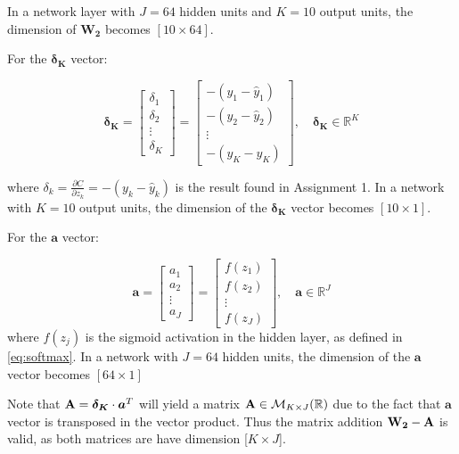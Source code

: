\documentclass{article}
\begin{document}
In a network layer with $J = 64$ hidden units and $K = 10$ output units, the dimension of $\mathbf{W_2}$ becomes $[10\times64]$.

For the $\boldsymbol{\delta_K}$ vector:

\begin{equation}
    \boldsymbol{\delta_K} = 
    \begin{bmatrix}
        \delta_1 \\
        \delta_2 \\
        \vdots \\
        \delta_K
    \end{bmatrix}
    = \begin{bmatrix}
        -(y_1 - \hat{y}_1) \\
        -(y_2 - \hat{y}_2)\\
        \vdots \\
        -(y_K - \hat{y}_K)
    \end{bmatrix}
    , \quad \boldsymbol{\delta_K} \in \mathbb{R}^K
    \label{eq:errorvec_k}
\end{equation}

where $\delta_k = \frac{\partial C}{\partial z_k} = -(y_k - \hat{y}_k)$ is the result found in Assignment 1. In a network with $K = 10$ output units, the dimension of the $\boldsymbol{\delta_K}$ vector becomes $[10\times1]$.

For the $\boldsymbol{a}$ vector:

\begin{equation}
    \boldsymbol{a} = \begin{bmatrix}
        a_1 \\
        a_2 \\
        \vdots \\
        a_J
    \end{bmatrix}
    =
    \begin{bmatrix}
        f(z_1) \\
        f(z_2) \\
        \vdots \\
        f(z_J)
    \end{bmatrix},
    \quad \boldsymbol{a} \in \mathbb{R}^J
\end{equation}
where $f(z_j)$ is the sigmoid activation in the hidden layer, as defined in \eqref{eq:softmax}. In a network with $J = 64$ hidden units, the dimension of the $\boldsymbol{a}$ vector becomes $[64\times1]$


    Note that $\text{\textbf{A}} = \boldsymbol{\delta_K} \cdot \boldsymbol{a}^T$ will yield a matrix $\text{\textbf{A}} \in \mathcal{M}_{K \times J}(\mathbb{R})$ due to the fact that $\boldsymbol{a}$ vector is transposed in the vector product. Thus the matrix addition $\text{\textbf{W}}_\textbf{2} - \text{\textbf{A}}$ is valid, as both matrices are have dimension [$K \times J$].  
\end{document}

